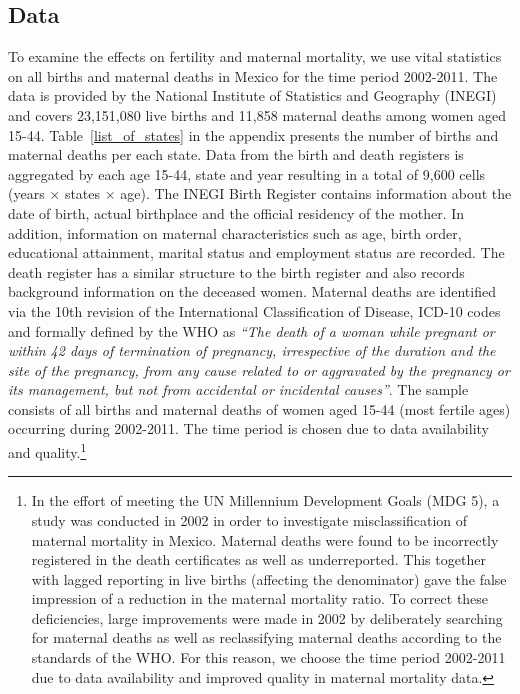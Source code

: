 \documentclass[a4paper, 11pt]{article}
\begin{document}
\begin{spacing}{2}
\section{Data}
\label{scn:data}
To examine the effects on fertility and maternal mortality, we use vital statistics on all births and maternal deaths in Mexico for the time period 2002-2011. The data is provided by the National Institute of Statistics and Geography (INEGI) and covers 23,151,080 live births and 11,858 maternal deaths among women aged 15-44. Table~\ref{list_of_states} in the appendix  presents the number of births and maternal deaths per each state. Data from the birth and death registers is aggregated by each age 15-44, state and year resulting in a total of 9,600 cells (years $\times$ states $\times$ age). The INEGI Birth Register contains information about the date of birth, actual birthplace and the official residency of the mother. In addition, information on maternal characteristics such as age, birth order, educational attainment, marital status and employment status are recorded. The death register has a similar structure to the birth register and also records background information on the deceased women. Maternal deaths are identified via the 10th revision of the International Classification of Disease, ICD-10 codes and formally defined by the WHO as \textit{``The death of a woman while pregnant or within 42 days of termination of pregnancy, irrespective of the duration and the site of the pregnancy, from any cause related to or aggravated by the pregnancy or its management, but not from accidental or incidental causes''}. The sample consists of all births and maternal deaths of women aged 15-44 (most fertile ages) occurring during 2002-2011. The time period is chosen due to data availability and quality.\footnote{In the effort of meeting the UN Millennium Development Goals (MDG 5), a study was conducted in 2002 in order to investigate misclassification of maternal mortality in Mexico. Maternal deaths were found to be incorrectly registered in the death certificates as well as underreported. This together with lagged reporting in live births (affecting the denominator) gave the false impression of a reduction in the maternal mortality ratio. To correct these deficiencies, large improvements were made in 2002 by deliberately searching for maternal deaths as well as reclassifying maternal deaths according to the standards of the WHO. For this reason, we choose the time period 2002-2011 due to data availability and improved quality in maternal mortality data.} 
    


\end{spacing}
\end{document}
